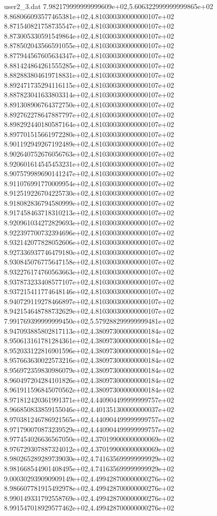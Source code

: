 \begin{filecontents}{user2_3.dat}
7.982179999999999609e+02,5.606322999999999865e+02
8.868066093577465381e+02,4.810300300000000107e+02
8.871540821758735547e+02,4.810300300000000107e+02
8.873005330591549864e+02,4.810300300000000107e+02
8.878502043566591055e+02,4.810300300000000107e+02
8.877944567605634347e+02,4.810300300000000107e+02
8.881424864261555285e+02,4.810300300000000107e+02
8.882883804619718831e+02,4.810300300000000107e+02
8.892471735294116115e+02,4.810300300000000107e+02
8.887823041633803314e+02,4.810300300000000107e+02
8.891308906764372750e+02,4.810300300000000107e+02
8.892762278647887797e+02,4.810300300000000107e+02
8.898292440180587164e+02,4.810300300000000107e+02
8.897701515661972280e+02,4.810300300000000107e+02
8.901192949267192489e+02,4.810300300000000107e+02
8.902640752676056763e+02,4.810300300000000107e+02
8.920601614545453231e+02,4.810300300000000107e+02
8.907579989690141247e+02,4.810300300000000107e+02
8.911076991770009954e+02,4.810300300000000107e+02
8.912519226704225730e+02,4.810300300000000107e+02
8.918082836794580999e+02,4.810300300000000107e+02
8.917458463718310213e+02,4.810300300000000107e+02
8.920961034272829693e+02,4.810300300000000107e+02
8.922397700732394696e+02,4.810300300000000107e+02
8.932142077828052606e+02,4.810300300000000107e+02
8.927336937746479180e+02,4.810300300000000107e+02
8.930845076775647158e+02,4.810300300000000107e+02
8.932276174760563663e+02,4.810300300000000107e+02
8.937873233408577107e+02,4.810300300000000107e+02
8.937215411774648146e+02,4.810300300000000107e+02
8.940729119278466897e+02,4.810300300000000107e+02
8.942154648788732629e+02,4.810300300000000107e+02
7.991769399999999450e+02,5.579288299999999481e+02
8.947093885802817113e+02,4.380973000000000184e+02
8.950613161781284361e+02,4.380973000000000184e+02
8.952033122816901596e+02,4.380973000000000184e+02
8.957663630022573216e+02,4.380973000000000184e+02
8.956972359830986079e+02,4.380973000000000184e+02
8.960497204284101826e+02,4.380973000000000184e+02
8.961911596845070562e+02,4.380973000000000184e+02
8.971812420361991371e+02,4.440904499999999757e+02
8.966850833859155046e+02,4.401351300000000037e+02
8.970381246786921565e+02,4.440904499999999757e+02
8.971790070873239529e+02,4.440904499999999757e+02
8.977454026636567050e+02,4.370199000000000069e+02
8.976729307887324012e+02,4.370199000000000069e+02
8.980265289289739030e+02,4.741635699999999929e+02
8.981668544901408495e+02,4.741635699999999929e+02
9.000302939090909149e+02,4.499428700000000276e+02
8.986607781915492978e+02,4.499428700000000276e+02
8.990149331792558769e+02,4.499428700000000276e+02
8.991547018929577462e+02,4.499428700000000276e+02

\end{filecontents}
